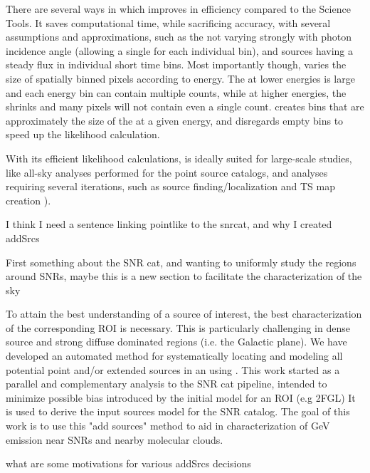 {There are several ways in which \ptlike{} improves in efficiency compared to the Science Tools. It saves computational time, while  sacrificing accuracy,
with several assumptions and approximations, such as the \psf{} not varying strongly with photon incidence angle (allowing a single \psf{} for each individual bin), and sources having a steady flux in individual short time bins. Most importantly though, \ptlike{} varies the size of spatially binned \heal{} pixels \citep{Gorski05} according to energy. The \psf{} at lower energies is large and each energy bin can contain multiple counts, while at higher energies, the \psf{} shrinks and many pixels will not contain even a single count. \ptlike{} creates \heal{} bins that are approximately the size of the \psf{} at a given energy, and disregards empty bins to speed up the likelihood calculation.

With its efficient likelihood calculations, \ptlike{} is ideally suited for large-scale studies, like all-sky analyses performed for the \lat{} point source catalogs, and analyses requiring several iterations, such as source finding/localization and TS map creation ). 

I think I need a sentence linking pointlike to the snrcat, and why I created addSrcs

First something about the SNR cat, and wanting to uniformly study the regions around SNRs, maybe this is a new section
to facilitate the characterization of the sky


To attain the best understanding of a source of interest, the best characterization of the corresponding ROI is necessary. This is particularly challenging in dense source and strong diffuse dominated regions (i.e. the Galactic plane). We have developed an automated method for systematically locating and modeling all potential point and/or extended sources in an \roi{} using \ptlike{}. This work started as a parallel and complementary analysis to the SNR cat pipeline, intended to minimize possible bias introduced by the initial model for an ROI (e.g 2FGL) It is  used to derive the input sources model for the SNR catalog. The goal of this work is to use this "add sources" method to aid in characterization of GeV emission near SNRs and nearby molecular clouds.

what are some motivations for various addSrcs decisions 

}
